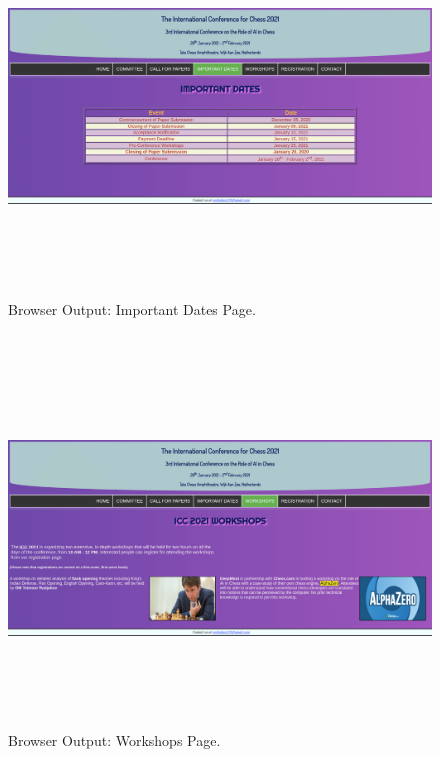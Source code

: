 \documentclass[12pt, a4]{article}
\begin{document}
\newpage
\subsection*{}
\begin{figure}[h]
\centering
\caption{Browser Output: Important Dates Page.}
\includegraphics[height=10cm, width=18cm, keepaspectratio]{Output/Dates.png}
\end{figure}

\newpage
\subsection*{}
\begin{figure}[h]
\centering
\caption{Browser Output: Workshops Page.}
\includegraphics[height=10cm, width=18cm, keepaspectratio]{Output/Workshops.png}
\end{figure}
\end{document}
